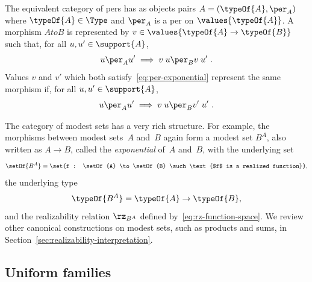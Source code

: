 The equivalent category of pers has as objects pairs $A = (\typeOf{A},
{\per_A})$ where $\typeOf{A} \in \Type$ and $\per_A$ is a per on
$\values{\typeOf{A}}$. A morphism $A to B$ is represented by $v
\in \values{\typeOf{A} \to \typeOf{B}}$ such that, for all $u, u'
\in \support{A}$,
%
\begin{equation}
  \label{eq:per-exponential}
  u \per_A u' \implies v\;u \per_B v\;u' \;.
\end{equation}
%
Values $v$ and $v'$ which both satisfy~\eqref{eq:per-exponential}
represent the same morphism if, for all $u, u' \in \support{A}$,
%
\begin{equation*}
  u \per_A u' \implies v\;u \per_B v'\;u' \;.
\end{equation*}

The category of modest sets has a very rich structure. For example,
the morphisms between modest sets~$A$ and~$B$ again form a modest set
$B^A$, also written as $A \to B$, called the \emph{exponential} of~$A$
and~$B$, with the underlying set
%
\begin{equation*}
  \setOf{B^A} =
  \set{f : \setOf{A} \to \setOf{B} \such \text{$f$ is a realized function}},
\end{equation*}
%
the underlying type
%
\begin{equation*}
  \typeOf{B^A} = \typeOf{A} \to \typeOf{B},
\end{equation*}
%
and the realizability relation $\rz_{B^A}$ defined
by~\eqref{eq:rz-function-space}. We review other canonical
constructions on modest sets, such as products and sums, in
Section~\ref{sec:realizability-interpretation}.



\subsection{Uniform families}
\label{sec:uniform-families}


